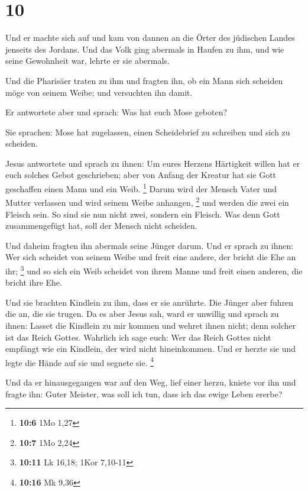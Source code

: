 \hypertarget{section-2}{%
\section{10}\label{section-2}}

 Und er machte sich auf und kam von dannen an die Örter des
jüdischen Landes jenseits des Jordans. Und das Volk ging abermals in
Haufen zu ihm, und wie seine Gewohnheit war, lehrte er sie abermals.

 Und die Pharisäer traten zu ihm und fragten ihn, ob ein
Mann sich scheiden möge von seinem Weibe; und versuchten ihn damit.

 Er antwortete aber und sprach: Was hat euch Mose geboten?

 Sie sprachen: Mose hat zugelassen, einen Scheidebrief zu
schreiben und sich zu scheiden.

 Jesus antwortete und sprach zu ihnen: Um eures Herzens
Härtigkeit willen hat er euch solches Gebot geschrieben; 
aber von Anfang der Kreatur hat sie Gott geschaffen einen Mann und ein
Weib. \footnote{\textbf{10:6} 1Mo 1,27}  Darum wird der
Mensch Vater und Mutter verlassen und wird seinem Weibe anhangen,
\footnote{\textbf{10:7} 1Mo 2,24}  und werden die zwei ein
Fleisch sein. So sind sie nun nicht zwei, sondern ein Fleisch.
 Was denn Gott zusammengefügt hat, soll der Mensch nicht
scheiden.

 Und daheim fragten ihn abermals seine Jünger darum.
 Und er sprach zu ihnen: Wer sich scheidet von seinem Weibe
und freit eine andere, der bricht die Ehe an ihr; \footnote{\textbf{10:11}
  Lk 16,18; 1Kor 7,10-11}  und so sich ein Weib scheidet
von ihrem Manne und freit einen anderen, die bricht ihre Ehe.

 Und sie brachten Kindlein zu ihm, dass er sie anrührte.
Die Jünger aber fuhren die an, die sie trugen.  Da es aber
Jesus sah, ward er unwillig und sprach zu ihnen: Lasset die Kindlein zu
mir kommen und wehret ihnen nicht; denn solcher ist das Reich Gottes.
 Wahrlich ich sage euch: Wer das Reich Gottes nicht
empfängt wie ein Kindlein, der wird nicht hineinkommen. 
Und er herzte sie und legte die Hände auf sie und segnete sie.
\footnote{\textbf{10:16} Mk 9,36}

 Und da er hinausgegangen war auf den Weg, lief einer
herzu, kniete vor ihn und fragte ihn: Guter Meister, was soll ich tun,
dass ich das ewige Leben ererbe?

